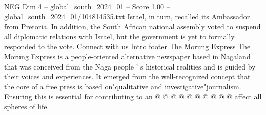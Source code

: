 \begin{textsample}{NEG Dim 4 – global\_south\_2024\_01 – Score 1.00 – global\_south\_2024\_01/104814535.txt}
Israel, in turn, recalled its Ambassador from Pretoria.
In addition, the South African national assembly voted to suspend all diplomatic relations with Israel, but the government is yet to formally responded to the vote.
Connect with us Intro footer The Morung Express The Morung Express is a people-oriented alternative newspaper based in Nagaland that was conceived from the Naga people ' s historical realities and is guided by their voices and experiences.
It emerged from the well-recognized concept that the core of a free press is based on"qualitative and investigative"journalism.
Ensuring this is essential for contributing to an @ @ @ @ @ @ @ @ @ @ affect all spheres of life.

\end{textsample}
